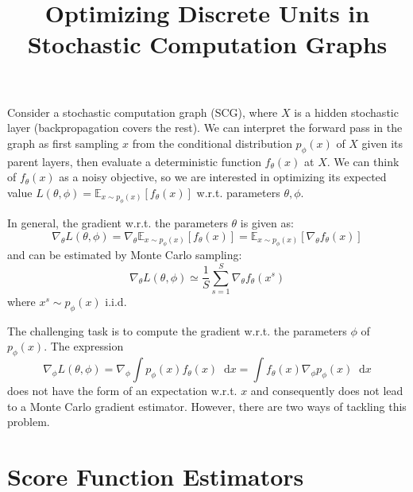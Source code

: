 \documentclass[11pt,a4paper]{article}
\title{Optimizing Discrete Units in Stochastic Computation Graphs}
\newcommand*\diff{\mathop{}\!\mathrm{d}}
\begin{document}
\maketitle


Consider a stochastic computation graph (SCG), where $X$ is a hidden stochastic layer (backpropagation covers the rest). We can interpret the forward pass in the graph as first sampling $x$ from the conditional distribution $p_\phi(x)$ of $X$ given its parent layers, then evaluate a deterministic function $f_\theta(x)$ at $X$. We can think of $f_\theta(x)$ as a noisy objective, so we are interested in optimizing its expected value $L(\theta, \phi) = \mathbb{E}_{x\sim p_\phi(x)}[f_\theta(x)]$ w.r.t. parameters $\theta, \phi$.

In general, the gradient w.r.t. the parameters $\theta$ is given as:
\begin{equation}
    \nabla_\theta L(\theta, \phi) = \nabla_\theta \mathbb{E}_{x\sim p_\phi(x)}[f_\theta(x)] = \mathbb{E}_{x\sim p_\phi(x)}[\nabla_\theta f_\theta(x)]
\end{equation}
and can be estimated by Monte Carlo sampling:
\begin{equation}
    \nabla_\theta L(\theta, \phi) \simeq \frac{1}{S} \sum_{s=1}^{S} \nabla_\theta f_\theta(x^{s})
\end{equation}
where $x^{s} \sim p_\phi(x)$ i.i.d. 

The challenging task is to compute the gradient w.r.t. the parameters $\phi$ of $p_\phi(x)$.
The expression
\begin{equation}
\label{grad}
    \nabla_\phi L(\theta, \phi) = \nabla_\phi \int p_\phi(x) f_\theta(x) \diff x = \int f_\theta(x) \nabla_\phi p_\phi(x) \diff x 
\end{equation}
does not have the form of an expectation w.r.t. $x$ and consequently does not lead to a Monte Carlo gradient estimator. However, there are two ways of tackling this problem.


\section{Score Function Estimators}
\end{document}
